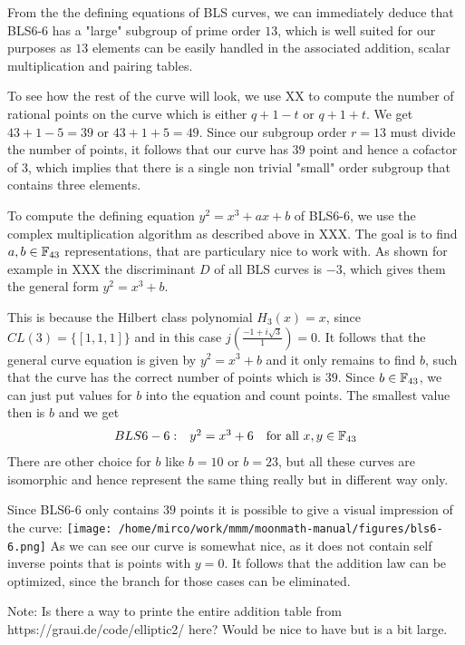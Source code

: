 From the the defining equations of BLS curves, we can immediately deduce that BLS6-6 has a "large" subgroup of prime order $13$, which is well suited for our purposes as $13$ elements can be easily handled in the associated addition, scalar multiplication and pairing tables. 

To see how the rest of the curve will look, we use XX to compute the number of rational points on the curve which is either $q+1-t$ or $q+1+t$. We get $43+1-5= 39$ or $43+1+5=49$. Since our subgroup order $r=13$ must divide the number of points, it follows that our curve has $39$ point and hence a cofactor of $3$, which implies that there is a single non trivial "small" order subgroup that contains three elements.

To compute the defining equation $y^2=x^3 + ax +b$ of BLS6-6, we use the complex multiplication algorithm as described above in XXX. The goal is to find $a,b\in\mathbb{F}_{43}$ representations, that are particulary nice to work with. As shown for example in XXX the discriminant $D$ of all BLS curves is $-3$, which gives them the general form $y^2 = x^3 +b$.

This is because the Hilbert class polynomial $H_3(x)=x$, since $CL(3) = \{[1,1,1]\}$ and in this case $j(\frac{-1 + i \sqrt{3}}{1})=0$. It follows that the general curve equation is given by $y^2 = x^3 +b$ and it only remains to find $b$, such that the curve has the correct number of points which is $39$. Since $b\in \mathbb{F}_{43}$, we can just put values for $b$ into the equation and count points. The smallest value then is $b$ and we get
$$
\begin{array}{lcrr}
BLS6-6: & y^2 = x^3 + 6& \text{for all } x,y \in \mathbb{F}_{43}
\end{array}
$$
There are other choice for $b$ like $b=10$ or $b=23$, but all these curves are isomorphic and hence represent the same thing really but in different way only.

Since BLS6-6 only contains $39$ points it is possible to give a visual impression of the curve:
\texttt{[image: /home/mirco/work/mmm/moonmath-manual/figures/bls6-6.png]}
As we can see our curve is somewhat nice, as it does not contain self inverse points that is points with $y=0$. It follows that the addition law can be optimized, since the branch for those cases can be eliminated. 

Note: Is there a way to printe the entire addition table from https://graui.de/code/elliptic2/ here? Would be nice to have but is a bit large.

